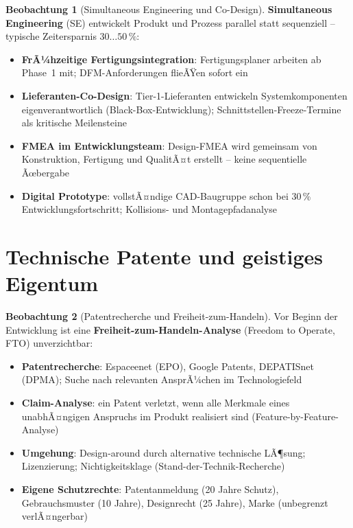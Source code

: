 ﻿\documentclass[a4paper,12pt]{report}
\theoremstyle{definition}
\newtheorem{beobachtung}{Beobachtung}
\begin{document}
\begin{beobachtung}[Simultaneous Engineering und Co-Design]
\textbf{Simultaneous Engineering} (SE) entwickelt Produkt und Prozess
parallel statt sequenziell -- typische Zeitersparnis $30\ldots50\,\%$:
\begin{itemize}
    \item[-] \textbf{FrÃ¼hzeitige Fertigungsintegration}: Fertigungsplaner
          arbeiten ab Phase~1 mit; DFM-Anforderungen flieÃŸen sofort ein
    \item[-] \textbf{Lieferanten-Co-Design}: Tier-1-Lieferanten entwickeln
          Systemkomponenten eigenverantwortlich (Black-Box-Entwicklung);
          Schnittstellen-Freeze-Termine als kritische Meilensteine
    \item[-] \textbf{FMEA im Entwicklungsteam}: Design-FMEA wird gemeinsam
          von Konstruktion, Fertigung und QualitÃ¤t erstellt -- keine
          sequentielle Ãœbergabe
    \item[-] \textbf{Digital Prototype}: vollstÃ¤ndige CAD-Baugruppe schon
          bei 30\,\% Entwicklungsfortschritt; Kollisions- und Montagepfadanalyse
\end{itemize}
\end{beobachtung}

\section{Technische Patente und geistiges Eigentum}

\begin{beobachtung}[Patentrecherche und Freiheit-zum-Handeln]
Vor Beginn der Entwicklung ist eine \textbf{Freiheit-zum-Handeln-Analyse}
(Freedom to Operate, FTO) unverzichtbar:
\begin{itemize}
    \item[-] \textbf{Patentrecherche}: Espaceenet (EPO), Google Patents,
          DEPATISnet (DPMA); Suche nach relevanten AnsprÃ¼chen im Technologiefeld
    \item[-] \textbf{Claim-Analyse}: ein Patent verletzt, wenn alle Merkmale
          eines unabhÃ¤ngigen Anspruchs im Produkt realisiert sind
          (Feature-by-Feature-Analyse)
    \item[-] \textbf{Umgehung}: Design-around durch alternative technische LÃ¶sung;
          Lizenzierung; Nichtigkeitsklage (Stand-der-Technik-Recherche)
    \item[-] \textbf{Eigene Schutzrechte}: Patentanmeldung (20 Jahre Schutz),
          Gebrauchsmuster (10 Jahre), Designrecht (25 Jahre),
          Marke (unbegrenzt verlÃ¤ngerbar)
\end{itemize}
\end{beobachtung}
\end{document}
